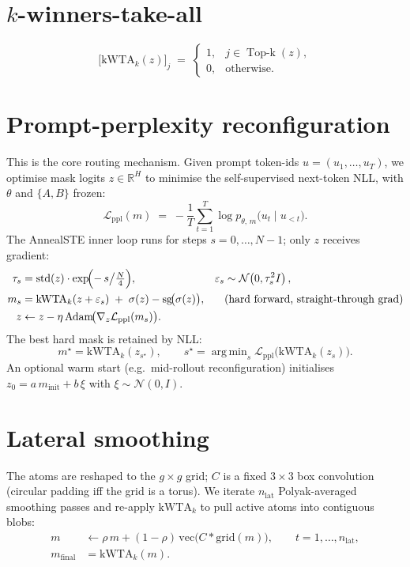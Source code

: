 \documentclass[11pt]{article}
\DeclareMathOperator*{\argmin}{arg\,min}
\DeclareMathOperator{\Topk}{Top\text{-}k}
\newcommand{\kwta}{\mathrm{kWTA}_k}
\newcommand{\sg}{\mathrm{sg}}        %
\newcommand{\vecop}{\mathrm{vec}}
\newcommand{\grid}{\mathrm{grid}}
\newcommand{\RR}{\mathbb{R}}
\newcommand{\Norm}[1]{\mathcal{N}\!\left(#1\right)}
\begin{document}
\section{$k$-winners-take-all}
\begin{equation}
  \bigl[\kwta(z)\bigr]_j \;=\;
  \begin{cases}
    1, & j \in \Topk(z), \\
    0, & \text{otherwise.}
  \end{cases}
\end{equation}

\section{Prompt-perplexity reconfiguration}
\label{sec:reconfig}
This is the core routing mechanism. Given prompt token-ids
$u = (u_1,\dots,u_T)$, we optimise mask logits $z \in \RR^H$ to minimise the
self-supervised next-token NLL, with $\theta$ and $\{A,B\}$ frozen:
\begin{equation}
  \mathcal{L}_{\mathrm{ppl}}(m) \;=\;
  -\frac{1}{T}\sum_{t=1}^{T} \log p_{\theta,\,m}\!\bigl(u_t \mid u_{<t}\bigr).
\end{equation}
The AnnealSTE inner loop runs for steps $s = 0,\dots,N-1$; only $z$ receives
gradient:
\begin{align}
  \tau_s &= \operatorname{std}(z)\cdot \exp\!\Bigl(-\,s \big/ \tfrac{N}{4}\Bigr),
            &\varepsilon_s &\sim \Norm{0,\tau_s^2 I}, \\
  m_s    &= \kwta(z + \varepsilon_s) \;+\; \sigma(z) - \sg\!\bigl(\sigma(z)\bigr),
            &&\text{(hard forward, straight-through grad)}\\
  z      &\leftarrow z - \eta\,\mathrm{Adam}\!\bigl(\nabla_z \mathcal{L}_{\mathrm{ppl}}(m_s)\bigr).
\end{align}
The best hard mask is retained by NLL:
\begin{equation}
  m^\star = \kwta(z_{s^\star}), \qquad
  s^\star = \argmin_{s} \mathcal{L}_{\mathrm{ppl}}\!\bigl(\kwta(z_s)\bigr).
\end{equation}
An optional warm start (e.g.\ mid-rollout reconfiguration) initialises
$z_0 = a\, m_{\text{init}} + b\,\xi$ with $\xi \sim \Norm{0,I}$.

\section{Lateral smoothing}
The atoms are reshaped to the $g\times g$ grid; $C$ is a fixed $3\times3$ box
convolution (circular padding iff the grid is a torus). We iterate $n_{\mathrm{lat}}$
Polyak-averaged smoothing passes and re-apply $\kwta$ to pull active atoms into
contiguous blobs:
\begin{align}
  m &\leftarrow \rho\, m + (1-\rho)\,\vecop\!\bigl(C * \grid(m)\bigr),
     \qquad t = 1,\dots,n_{\mathrm{lat}}, \\
  m_{\mathrm{final}} &= \kwta(m).
\end{align}
\end{document}
